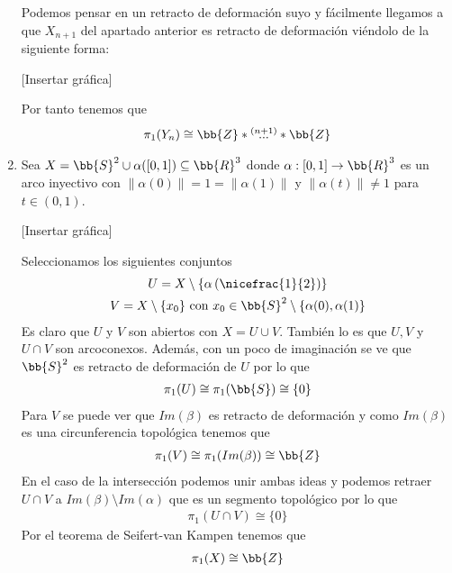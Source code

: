 \begin{ejemplo}
\begin{enumerate}
        Podemos pensar en un retracto de deformación suyo y fácilmente llegamos a que $X_{n+1}$ del apartado anterior es retracto de deformación viéndolo de la siguiente forma:

        [Insertar gráfica]

        Por tanto tenemos que
        \begin{gather*}
            \pi_1(Y_n) \cong \bb{Z} \ast \overset{(n+1)}{...} \ast \bb{Z}
        \end{gather*}

        \item Sea $X=\bb{S}^2\cup \alpha ([0,1]) \subseteq \bb{R}^3$ donde $\alpha:[0,1] \to \bb{R}^3$ es un arco inyectivo con $\|\alpha(0)\| = 1 = \|\alpha(1)\|$ y $\|\alpha(t)\| \neq 1$ para $t\in (0,1)$.
        
        [Insertar gráfica]

        Seleccionamos los siguientes conjuntos
        \begin{gather*}
            U=X\setminus\left\{\alpha\left(\nicefrac{1}{2}\right)\right\}\\
            V = X\setminus\{x_0\}\text{ con } x_0\in \bb{S}^2 \setminus\{\alpha(0),\alpha(1)\}
        \end{gather*}
        Es claro que $U$ y $V$ son abiertos con $X=U\cup V$. También lo es que $U,V$ y $U\cap V$ son arcoconexos. Además, con un poco de imaginación se ve que $\bb{S}^2$ es retracto de deformación de $U$ por lo que 
        \begin{gather*}
            \pi_1(U)\cong \pi_1 (\bb{S}) \cong \{0\}
        \end{gather*}
        Para $V$ se puede ver que $Im(\beta)$ es retracto de deformación y como $Im(\beta)$ es una circunferencia topológica tenemos que 
        \begin{gather*}
            \pi_1(V) \cong \pi_1(Im(\beta)) \cong \bb{Z}
        \end{gather*}
        En el caso de la intersección podemos unir ambas ideas y podemos retraer $U\cap V$ a $Im(\beta)\setminus Im(\alpha)$ que es un segmento topológico por lo que 
        \begin{gather*}
            \pi_1(U\cap V) \cong \{0\}
        \end{gather*}
        Por el teorema de Seifert-van Kampen tenemos que 
        \begin{gather*}
            \pi_1(X)\cong \bb{Z}
        \end{gather*}
    \end{enumerate}
\end{ejemplo}

